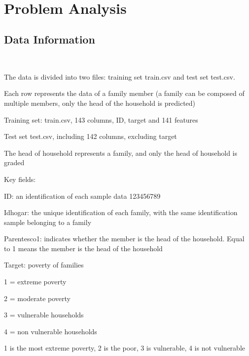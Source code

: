 \


\section{Problem Analysis} \label{sec-data_exploration}

\subsection{Data Information}
\

The data is divided into two files: training set train.csv and test set test.csv.

Each row represents the data of a family member (a family can be composed of multiple members, only the head of the household is predicted)

Training set: train.csv, 143 columns, ID, target and 141 features

Test set test.csv, including 142 columns, excluding target

The head of household represents a family, and only the head of household is graded

Key fields:

ID: an identification of each sample data 123456789

Idhogar: the unique identification of each family, with the same identification sample belonging to a family

Parentesco1: indicates whether the member is the head of the household. Equal to 1 means the member is the head of the household

Target: poverty of families

1 = extreme poverty

2 = moderate poverty

3 = vulnerable households

4 = non vulnerable households

1 is the most extreme poverty, 2 is the poor, 3 is vulnerable, 4 is not vulnerable

